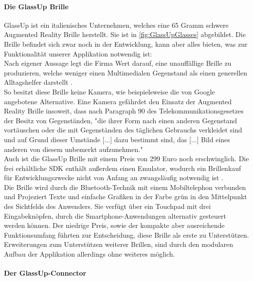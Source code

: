 \paragraph{Die GlassUp Brille}
GlassUp ist ein italienisches Unternehmen, welches eine 65 Gramm \cite{faq} schwere Augmented Reality Brille herstellt. Sie ist in \ref{fig:GlassUpGlasses} abgebildet. Die Brille befindet sich zwar noch in der Entwicklung, kann aber alles bieten, was zur Funktionalität unserer Applikation notwendig ist:\\
Nach eigener Aussage legt die Firma Wert darauf, eine unauffällige Brille zu produzieren, welche weniger einen Multimedialen Gegenstand als einen generellen Alltagshelfer darstellt \cite{home}.\\
So besitzt diese Brille keine Kamera, wie beispielsweise die von Google angebotene Alternative\cite{google glasses}. Eine Kamera gefährdet den Einsatz der Augmented Reality Brille insoweit, dass nach Paragraph 90 des Telekommunikationsgesetzes der Besitz von Gegenständen, "die ihrer Form nach einen anderen Gegenstand vortäuschen oder die mit Gegenständen des täglichen Gebrauchs verkleidet sind und auf Grund dieser Umstände [...] dazu bestimmt sind, das [...] Bild eines anderen von diesem unbemerkt aufzunehmen."\\
Auch ist die GlassUp Brille mit einem Preis von 299 Euro \cite{faq} noch erschwinglich. Die frei erhältliche SDK enthält außerdem einen Emulator, wodurch ein Brillenkauf für Entwicklungszwecke nicht von Anfang an zwangsläufig notwendig ist \cite{SDK}.\\
Die Brille wird durch die Bluetooth-Technik mit einem Mobiltelephon verbunden und Projeziert Texte und einfache Grafiken in der Farbe grün in den Mittelpunkt des Sichtfelds des Anwenders.
Sie verfügt über ein Touchpad mit drei Eingabeknöpfen, durch die Smartphone-Anwendungen alternativ gesteuert werden können.
Der niedrige Preis, sowie der kompakte aber ausreichende Funktionsumfang führten zur Entscheidung, diese Brille als erste zu Unterstützen. Erweiterungen zum Unterstützen weiterer Brillen, sind durch den modularen Aufbau der Applikation allerdings ohne weiteres möglich.

\paragraph{Der GlassUp-Connector}





